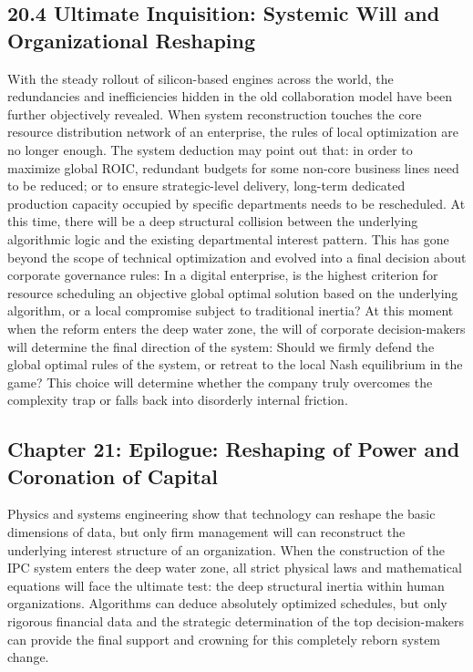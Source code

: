 \documentclass[11pt,a4paper]{article}
\begin{document}
\subsection*{20.4 Ultimate Inquisition: Systemic Will and Organizational Reshaping}


With the steady rollout of silicon-based engines across the world, the redundancies and inefficiencies hidden in the old collaboration model have been further objectively revealed. When system reconstruction touches the core resource distribution network of an enterprise, the rules of local optimization are no longer enough. The system deduction may point out that: in order to maximize global ROIC, redundant budgets for some non-core business lines need to be reduced; or to ensure strategic-level delivery, long-term dedicated production capacity occupied by specific departments needs to be rescheduled. At this time, there will be a deep structural collision between the underlying algorithmic logic and the existing departmental interest pattern. This has gone beyond the scope of technical optimization and evolved into a final decision about corporate governance rules: In a digital enterprise, is the highest criterion for resource scheduling an objective global optimal solution based on the underlying algorithm, or a local compromise subject to traditional inertia? At this moment when the reform enters the deep water zone, the will of corporate decision-makers will determine the final direction of the system: Should we firmly defend the global optimal rules of the system, or retreat to the local Nash equilibrium in the game? This choice will determine whether the company truly overcomes the complexity trap or falls back into disorderly internal friction.

\subsection*{Chapter 21: Epilogue: Reshaping of Power and Coronation of Capital}
Physics and systems engineering show that technology can reshape the basic dimensions of data, but only firm management will can reconstruct the underlying interest structure of an organization. When the construction of the IPC system enters the deep water zone, all strict physical laws and mathematical equations will face the ultimate test: the deep structural inertia within human organizations. Algorithms can deduce absolutely optimized schedules, but only rigorous financial data and the strategic determination of the top decision-makers can provide the final support and crowning for this completely reborn system change.
\end{document}
